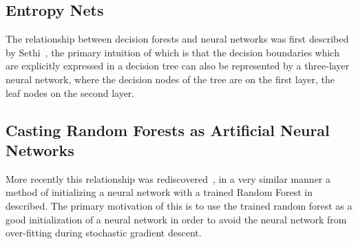 \documentclass[thesis]{subfiles}
\begin{document}
\subsection{Entropy Nets}
The relationship between decision forests and neural networks was first described by Sethi~\cite{Sethi1990}, the primary intuition of which is that the decision boundaries which are explicitly expressed in a decision tree can also be represented by a three-layer neural network, where the decision nodes of the tree are on the first layer, the leaf nodes on the second layer.

\subsection{Casting Random Forests as Artificial Neural Networks}
More recently this relationship was rediscovered~\cite{Welbl2014casting}, in a very similar manner a method of initializing a neural network with a trained Random Forest in described. The primary motivation of this is to use the trained random forest as a good initialization of a neural network in order to avoid the neural network from over-fitting during stochastic gradient descent.
\end{document}
